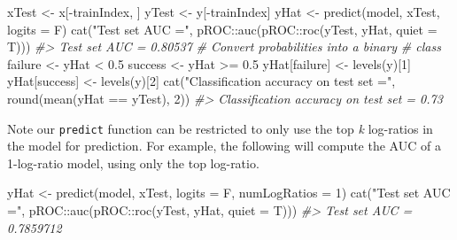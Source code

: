 \documentclass[
]{article}
\newenvironment{Shaded}{\begin{snugshade}}{\end{snugshade}}
\newcommand{\AttributeTok}[1]{\textcolor[rgb]{0.77,0.63,0.00}{#1}}
\newcommand{\CommentTok}[1]{\textcolor[rgb]{0.56,0.35,0.01}{\textit{#1}}}
\newcommand{\DecValTok}[1]{\textcolor[rgb]{0.00,0.00,0.81}{#1}}
\newcommand{\FloatTok}[1]{\textcolor[rgb]{0.00,0.00,0.81}{#1}}
\newcommand{\FunctionTok}[1]{\textcolor[rgb]{0.00,0.00,0.00}{#1}}
\newcommand{\NormalTok}[1]{#1}
\newcommand{\OtherTok}[1]{\textcolor[rgb]{0.56,0.35,0.01}{#1}}
\newcommand{\SpecialCharTok}[1]{\textcolor[rgb]{0.00,0.00,0.00}{#1}}
\newcommand{\StringTok}[1]{\textcolor[rgb]{0.31,0.60,0.02}{#1}}
\begin{document}
\begin{Shaded}
\begin{Highlighting}[]
\NormalTok{xTest }\OtherTok{\textless{}{-}}\NormalTok{ x[}\SpecialCharTok{{-}}\NormalTok{trainIndex, ]}
\NormalTok{yTest }\OtherTok{\textless{}{-}}\NormalTok{ y[}\SpecialCharTok{{-}}\NormalTok{trainIndex]}
\NormalTok{yHat }\OtherTok{\textless{}{-}} \FunctionTok{predict}\NormalTok{(model, xTest, }\AttributeTok{logits =}\NormalTok{ F)}
\FunctionTok{cat}\NormalTok{(}\StringTok{"Test set AUC ="}\NormalTok{, pROC}\SpecialCharTok{::}\FunctionTok{auc}\NormalTok{(pROC}\SpecialCharTok{::}\FunctionTok{roc}\NormalTok{(yTest,}
\NormalTok{    yHat, }\AttributeTok{quiet =}\NormalTok{ T)))}
\CommentTok{\#\textgreater{} Test set AUC = 0.80537}
\CommentTok{\# Convert probabilities into a binary}
\CommentTok{\# class}
\NormalTok{failure }\OtherTok{\textless{}{-}}\NormalTok{ yHat }\SpecialCharTok{\textless{}} \FloatTok{0.5}
\NormalTok{success }\OtherTok{\textless{}{-}}\NormalTok{ yHat }\SpecialCharTok{\textgreater{}=} \FloatTok{0.5}
\NormalTok{yHat[failure] }\OtherTok{\textless{}{-}} \FunctionTok{levels}\NormalTok{(y)[}\DecValTok{1}\NormalTok{]}
\NormalTok{yHat[success] }\OtherTok{\textless{}{-}} \FunctionTok{levels}\NormalTok{(y)[}\DecValTok{2}\NormalTok{]}
\FunctionTok{cat}\NormalTok{(}\StringTok{"Classification accuracy on test set ="}\NormalTok{,}
    \FunctionTok{round}\NormalTok{(}\FunctionTok{mean}\NormalTok{(yHat }\SpecialCharTok{==}\NormalTok{ yTest), }\DecValTok{2}\NormalTok{))}
\CommentTok{\#\textgreater{} Classification accuracy on test set = 0.73}
\end{Highlighting}
\end{Shaded}

Note our \texttt{predict} function can be restricted to only use the top
\emph{k} log-ratios in the model for prediction. For example, the
following will compute the AUC of a 1-log-ratio model, using only the
top log-ratio.

\begin{Shaded}
\begin{Highlighting}[]
\NormalTok{yHat }\OtherTok{\textless{}{-}} \FunctionTok{predict}\NormalTok{(model, xTest, }\AttributeTok{logits =}\NormalTok{ F,}
    \AttributeTok{numLogRatios =} \DecValTok{1}\NormalTok{)}
\FunctionTok{cat}\NormalTok{(}\StringTok{"Test set AUC ="}\NormalTok{, pROC}\SpecialCharTok{::}\FunctionTok{auc}\NormalTok{(pROC}\SpecialCharTok{::}\FunctionTok{roc}\NormalTok{(yTest,}
\NormalTok{    yHat, }\AttributeTok{quiet =}\NormalTok{ T)))}
\CommentTok{\#\textgreater{} Test set AUC = 0.7859712}
\end{Highlighting}
\end{Shaded}
\end{document}
